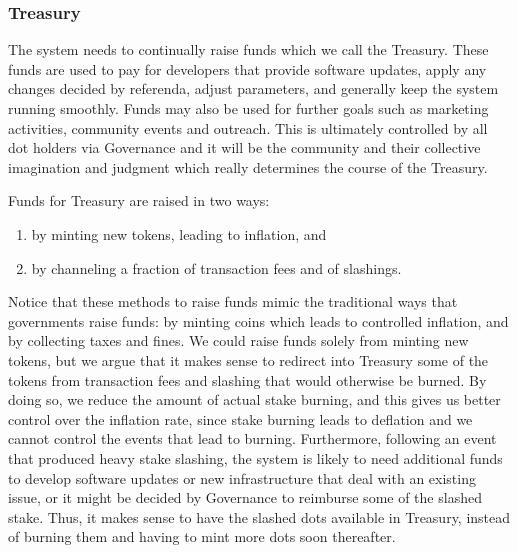 \subsubsection{Treasury}\label{sec:treasury}

 The system needs to continually raise funds which we call the Treasury.
 These funds are used to pay for developers that provide software updates, apply any changes decided by referenda, adjust parameters, and generally keep the system running smoothly. Funds may also be used for further goals such as marketing activities, community events and outreach. This is ultimately controlled by all dot holders via Governance and it will be the community and their collective imagination and judgment which really determines the course of the Treasury.

Funds for Treasury are raised in two ways:

\begin{enumerate}
\item by minting new tokens, leading to inflation, and
\item by channeling a fraction of transaction fees and of slashings.
\end{enumerate}

 
Notice that these methods to raise funds mimic the traditional ways that governments raise funds: by minting coins which leads to controlled inflation, and by collecting taxes and fines.
We could raise funds solely from minting new tokens, but we argue that it makes sense to redirect into Treasury some of the tokens from transaction fees and slashing that would otherwise be burned. By doing so, we reduce the amount of actual stake burning, and this gives us better control over the inflation rate, since stake burning leads to deflation and we cannot control the events that lead to burning. Furthermore, following an event that produced heavy stake slashing, the system is likely to need additional funds to develop software updates or new infrastructure that deal with an existing issue, or it might be decided by Governance to reimburse some of the slashed stake. Thus, it makes sense to have the slashed dots available in Treasury, instead of burning them and having to mint more dots soon thereafter.
